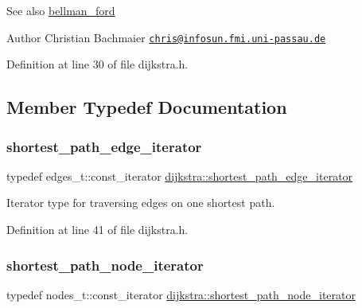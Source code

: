 \begin{DoxySeeAlso}{See also}
\mbox{\hyperlink{classbellman__ford}{bellman\+\_\+ford}}
\end{DoxySeeAlso}
\begin{DoxyAuthor}{Author}
Christian Bachmaier \href{mailto:chris@infosun.fmi.uni-passau.de}{\tt chris@infosun.\+fmi.\+uni-\/passau.\+de} 
\end{DoxyAuthor}


Definition at line 30 of file dijkstra.\+h.



\subsection{Member Typedef Documentation}
\mbox{\label{classdijkstra_afb9a918f95b13aefcef331896fe3b41c}} 
\subsubsection{\texorpdfstring{shortest\+\_\+path\+\_\+edge\+\_\+iterator}{shortest\_path\_edge\_iterator}}
{\footnotesize\ttfamily typedef edges\+\_\+t\+::const\+\_\+iterator \mbox{\hyperlink{classdijkstra_afb9a918f95b13aefcef331896fe3b41c}{dijkstra\+::shortest\+\_\+path\+\_\+edge\+\_\+iterator}}}



Iterator type for traversing edges on one shortest path. 



Definition at line 41 of file dijkstra.\+h.

\mbox{\label{classdijkstra_a2ba040b6e45343a2c3675788968d9113}} 
\subsubsection{\texorpdfstring{shortest\+\_\+path\+\_\+node\+\_\+iterator}{shortest\_path\_node\_iterator}}
{\footnotesize\ttfamily typedef nodes\+\_\+t\+::const\+\_\+iterator \mbox{\hyperlink{classdijkstra_a2ba040b6e45343a2c3675788968d9113}{dijkstra\+::shortest\+\_\+path\+\_\+node\+\_\+iterator}}}



